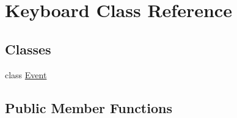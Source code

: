 \hypertarget{class_keyboard}{}\section{Keyboard Class Reference}
\label{class_keyboard}
\subsection*{Classes}
\begin{DoxyCompactItemize}
\item 
class \hyperlink{class_keyboard_1_1_event}{Event}
\end{DoxyCompactItemize}
\subsection*{Public Member Functions}
